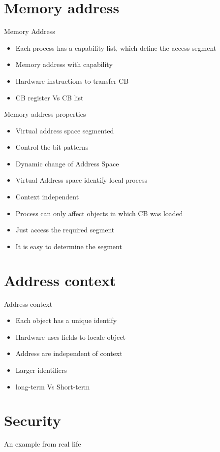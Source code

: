 \documentclass[10pt, compress, aspectratio=169]{beamer}
\begin{document}
\section{Memory address}
\begin{frame}{Memory Address}
  \begin{itemize}
    \item Each process has a capability list, which define the access segment
    \item Memory address with capability
    \item Hardware instructions to transfer CB
    \item CB register Vs CB list
  \end{itemize}
\end{frame}

\begin{frame}{Memory address properties}
  \begin{itemize}
    \item Virtual address space segmented
    \item Control the bit patterns
    \item Dynamic change of Address Space
    \item Virtual Address space identify local process
    \item Context independent
  \end{itemize}
  \begin{itemize}
    \item Process can only affect objects in which CB was loaded
    \item Just access the required segment
    \item It is easy to determine the segment
  \end{itemize}
\end{frame}

\section{Address context}
\begin{frame}{Address context}
  \begin{itemize}
    \item Each object has a unique identify
    \item Hardware uses fields to locale object
    \item Address are independent of context
    \item Larger identifiers
    \item long-term Vs Short-term
  \end{itemize}
\end{frame}

\section{Security}
\begin{frame}{An example from real life}
  
\end{frame}
\end{document}
